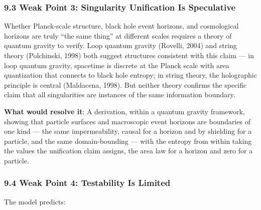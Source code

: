\documentclass[
]{article}
\begin{document}
\hypertarget{weak-point-3-singularity-unification-is-speculative}{%
\subsubsection{9.3 Weak Point 3: Singularity Unification Is
Speculative}\label{weak-point-3-singularity-unification-is-speculative}}

Whether Planck-scale structure, black hole event horizons, and
cosmological horizons are truly ``the same thing'' at different scales
requires a theory of quantum gravity to verify. Loop quantum gravity
(Rovelli, 2004) and string theory (Polchinski, 1998) both suggest
structures consistent with this claim --- in loop quantum gravity,
spacetime is discrete at the Planck scale with area quantization that
connects to black hole entropy; in string theory, the holographic
principle is central (Maldacena, 1998). But neither theory confirms the
specific claim that all singularities are instances of the same
information boundary.

\textbf{What would resolve it}: A derivation, within a quantum gravity
framework, showing that particle surfaces and macroscopic event horizons
are boundaries of one kind --- the same impermeability, causal for a
horizon and by shielding for a particle, and the same domain-bounding
--- with the entropy from within taking the values the unification claim
assigns, the area law for a horizon and zero for a particle.

\hypertarget{weak-point-4-testability-is-limited}{%
\subsubsection{9.4 Weak Point 4: Testability Is
Limited}\label{weak-point-4-testability-is-limited}}

The model predicts:
\end{document}
